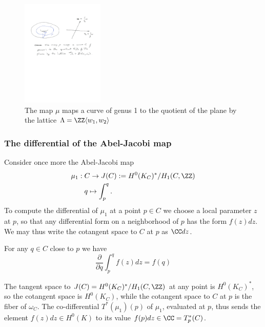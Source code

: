 %

\begin{figure}
 \caption{The map $\mu$ maps a curve of genus 1 to the quotient of the plane by the lattice $\Lambda = \ZZ\langle w_1,w_2\rangle$}
\centerline {\includegraphics[height=2in]{"Fig4.1.pdf"}}
\end{figure}


\subsubsection{The differential of the Abel-Jacobi map}\label{Abel-Jacobi differential}

Consider once more the  Abel-Jacobi map
$$
\begin{aligned}
\mu_1 : \; &C \to J(C) := H^0(K_C)^*/H_1(C, \ZZ) \\
&q \mapsto \int_p^q .
\end{aligned}
$$
To compute the differential of $\mu_1$ at a point $p\in C$ we choose a local parameter $z$ at $p$, so that  any differential form on a neighborhood of $p$ has the form $f(z)dz$. We may thus write the cotangent space to $C$ at $p$ as $\CC dz$.

 For any $q\in C$ close to $p$ we have
$$
\frac{\partial}{\partial q} \int_p^q f(z)dz = f(q)
$$

The tangent space to $J(C) =  H^0(K_C)^*/H_1(C, \ZZ)$ at any point is $H^0(K_C)^*$, so the cotangent space is $H^0(K_C)$, while the cotangent space to $C$ at $p$ is the fiber of $\omega_C$.
The co-differential 
$T^*(\mu_1)(p)$ of $\mu_1$, evaluated at $p$, thus sends the element $f(z) dz\in H^0(K)$ to its value
$f(p)dz \in \CC = T^*_p(C)$. 

